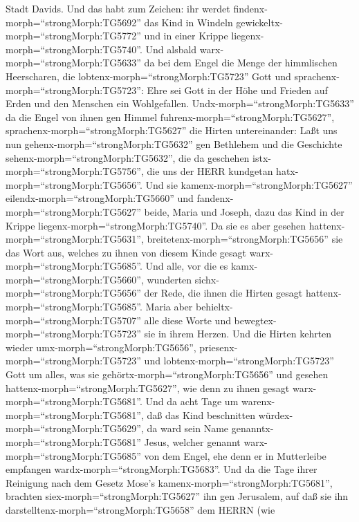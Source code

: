 Stadt Davids.  Und das habt zum Zeichen: ihr werdet
findenx-morph=``strongMorph:TG5692'' das Kind in Windeln
gewickeltx-morph=``strongMorph:TG5772'' und in einer Krippe
liegenx-morph=``strongMorph:TG5740''.  Und alsbald
warx-morph=``strongMorph:TG5633'' da bei dem Engel die Menge der
himmlischen Heerscharen, die lobtenx-morph=``strongMorph:TG5723'' Gott
und sprachenx-morph=``strongMorph:TG5723'':  Ehre sei Gott
in der Höhe und Frieden auf Erden und den Menschen ein Wohlgefallen.
 Undx-morph=``strongMorph:TG5633'' da die Engel von ihnen
gen Himmel fuhrenx-morph=``strongMorph:TG5627'',
sprachenx-morph=``strongMorph:TG5627'' die Hirten untereinander: Laßt
uns nun gehenx-morph=``strongMorph:TG5632'' gen Bethlehem und die
Geschichte sehenx-morph=``strongMorph:TG5632'', die da geschehen
istx-morph=``strongMorph:TG5756'', die uns der HERR kundgetan
hatx-morph=``strongMorph:TG5656''.  Und sie
kamenx-morph=``strongMorph:TG5627'' eilendx-morph=``strongMorph:TG5660''
und fandenx-morph=``strongMorph:TG5627'' beide, Maria und Joseph, dazu
das Kind in der Krippe liegenx-morph=``strongMorph:TG5740''.
 Da sie es aber gesehen
hattenx-morph=``strongMorph:TG5631'',
breitetenx-morph=``strongMorph:TG5656'' sie das Wort aus, welches zu
ihnen von diesem Kinde gesagt warx-morph=``strongMorph:TG5685''.
 Und alle, vor die es kamx-morph=``strongMorph:TG5660'',
wunderten sichx-morph=``strongMorph:TG5656'' der Rede, die ihnen die
Hirten gesagt hattenx-morph=``strongMorph:TG5685''.  Maria
aber behieltx-morph=``strongMorph:TG5707'' alle diese Worte und
bewegtex-morph=``strongMorph:TG5723'' sie in ihrem Herzen. 
Und die Hirten kehrten wieder umx-morph=``strongMorph:TG5656'',
priesenx-morph=``strongMorph:TG5723'' und
lobtenx-morph=``strongMorph:TG5723'' Gott um alles, was sie
gehörtx-morph=``strongMorph:TG5656'' und gesehen
hattenx-morph=``strongMorph:TG5627'', wie denn zu ihnen gesagt
warx-morph=``strongMorph:TG5681''.  Und da acht Tage um
warenx-morph=``strongMorph:TG5681'', daß das Kind beschnitten
würdex-morph=``strongMorph:TG5629'', da ward sein Name
genanntx-morph=``strongMorph:TG5681'' Jesus, welcher genannt
warx-morph=``strongMorph:TG5685'' von dem Engel, ehe denn er in
Mutterleibe empfangen wardx-morph=``strongMorph:TG5683''. 
Und da die Tage ihrer Reinigung nach dem Gesetz Mose's
kamenx-morph=``strongMorph:TG5681'', brachten
siex-morph=``strongMorph:TG5627'' ihn gen Jerusalem, auf daß sie ihn
darstelltenx-morph=``strongMorph:TG5658'' dem HERRN  (wie
